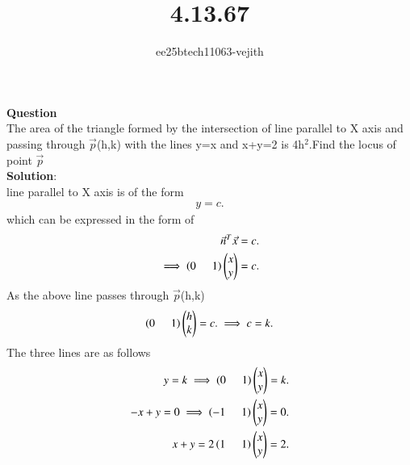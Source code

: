 \documentclass[journal]{IEEEtran}
\begin{document}

\vspace{3cm}

\title{4.13.67}
\author{ee25btech11063-vejith}

\maketitle
{\let\newpage\relax\maketitle}
\renewcommand{\thefigure}{\theenumi}
\renewcommand{\thetable}{\theenumi}
\setlength{\intextsep}{10pt} %
\textbf{Question}\\
The area of the triangle formed by the intersection of line parallel to X axis and passing through $\Vec{p}$(h,k) with the lines y=x and x+y=2 is 4h$^2$.Find the locus of point $\Vec{p}$\\
\textbf{Solution}:\\
line parallel to X axis is of the form 
\begin{align}
    y=c.
\end{align}
which can be expressed in the form of 
\begin{align}
    \Vec{n}^T\Vec{x}=c.\\
     \implies \left(0\hspace{0.5cm}1\right)\begin{pmatrix}x\\y\end{pmatrix}=c.
\end{align}
As the above line passes through $\Vec{p}$(h,k)
\begin{align}
     \left(0\hspace{0.5cm}1\right)\begin{pmatrix}h\\k\end{pmatrix}=c.
     \implies c=k.
\end{align}
The three lines are as follows
\begin{align}
    y=k\implies \left(0\hspace{0.5cm}1\right)\begin{pmatrix}x\\y\end{pmatrix}=k.\\
    -x+y=0 \implies \left(-1\hspace{0.5cm}1\right)\begin{pmatrix}x\\y\end{pmatrix}=0.\\
    x+y=2 \left(1\hspace{0.5cm}1\right)\begin{pmatrix}x\\y\end{pmatrix}=2.
\end{align}
\end{document}
